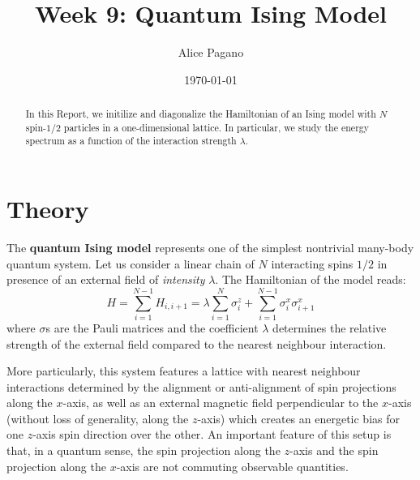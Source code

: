 \documentclass[rmp,10pt,onecolumn,fleqn,notitlepage]{revtex4-1}
\begin{document}
\title{Week 9: Quantum Ising Model}
\author{Alice Pagano}
\date{\today}

\begin{abstract}
In this Report, we initilize and diagonalize the Hamiltonian of an Ising model with \( N \) spin-$1/2$ particles in a one-dimensional lattice. In particular, we study the energy spectrum as a function of the interaction strength \(
\lambda  \).
\end{abstract}

\maketitle


\section{Theory}
The \textbf{quantum Ising model} represents one of the simplest nontrivial many-body quantum system. Let us consider a linear chain of $N$ interacting spins $1/2$ in presence of an external field of \emph{intensity} $\lambda$. The Hamiltonian of the model reads:
\begin{equation}
  H = \sum_{i=1}^{N-1} H_{i,i+1} = \lambda \sum_{i=1}^{N} \sigma _i^{z} + \sum_{i=1}^{N-1} \sigma _{i}^{x} \sigma _{i+1}^{x}
  \label{eq:hamiltonian}
\end{equation}
where \( \sigma  \)s are the Pauli matrices and the coefficient $\lambda$ determines the relative strength of the external field compared to the nearest neighbour interaction.

More particularly, this system features a lattice with nearest neighbour interactions determined by the alignment or anti-alignment of spin projections along the $x$-axis, as well as an external magnetic field perpendicular to the $x$-axis (without loss of generality, along the $z$-axis) which creates an energetic bias for one $z$-axis spin direction over the other.
An important feature of this setup is that, in a quantum sense, the spin projection along the $z$-axis and the spin projection along the $x$-axis are not commuting observable quantities.

%
%
%
\end{document}
